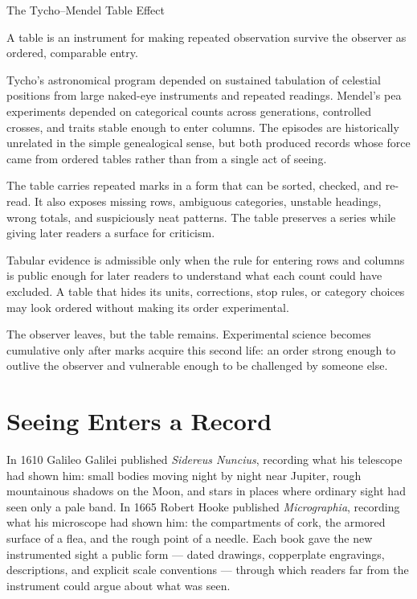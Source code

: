\begin{phenom}{The Tycho--Mendel Table Effect~\cite{mendel1866,tycho1602}}
\label{ph:tycho-mendel-table}

\PhStatement
A table is an instrument for making repeated observation survive the observer
as ordered, comparable entry.

\PhOrigin
Tycho's astronomical program depended on sustained tabulation of celestial
positions from large naked-eye instruments and repeated readings. Mendel's pea
experiments depended on categorical counts across generations, controlled
crosses, and traits stable enough to enter columns. The episodes are
historically unrelated in the simple genealogical sense, but both produced
records whose force came from ordered tables rather than from a single act of
seeing.

\PhObservation
The table carries repeated marks in a form that can be sorted, checked, and
re-read. It also exposes missing rows, ambiguous categories, unstable headings,
wrong totals, and suspiciously neat patterns. The table preserves a series
while giving later readers a surface for criticism.

\PhConstraint
Tabular evidence is admissible only when the rule for entering rows and columns
is public enough for later readers to understand what each count could have
excluded. A table that hides its units, corrections, stop rules, or category
choices may look ordered without making its order experimental.

\PhConsequence
The observer leaves, but the table remains. Experimental science becomes
cumulative only after marks acquire this second life: an order strong enough to
outlive the observer and vulnerable enough to be challenged by someone else.
\end{phenom}

\section{Seeing Enters a Record}

In 1610 Galileo Galilei published \emph{Sidereus Nuncius}, recording what
his telescope had shown him: small bodies moving night by night near
Jupiter, rough mountainous shadows on the Moon, and stars in places where
ordinary sight had seen only a pale band. In 1665 Robert Hooke published
\emph{Micrographia}, recording what his microscope had shown him: the
compartments of cork, the armored surface of a flea, and the rough point
of a needle. Each book gave the new
instrumented sight a public form --- dated drawings, copperplate
engravings, descriptions, and explicit scale conventions --- through which readers far
from the instrument could argue about what was seen.

